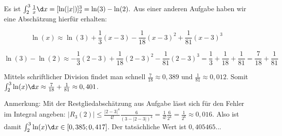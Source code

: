 \item Es ist $\int_2^3 \frac{1}{x} \d x = \lbrack \ln(|x|) \rbrack_2^3 = \ln(3) - \ln(2).$ Aus einer anderen Aufgabe haben wir eine Abschätzung hierfür erhalten:

$$\ln(x) \approx \ln(3) + \frac{1}{3} (x-3) - \frac{1}{18} (x-3)^2 + \frac{1}{81} (x-3)^3$$

$$\ln(3)-\ln(2) \approx -\frac{1}{3} (2-3) + \frac{1}{18} (2-3)^2 - \frac{1}{81} (2-3)^3 = \frac{1}{3}+\frac{1}{18}+\frac{1}{81} = \frac{7}{18} + \frac{1}{81}$$

Mittels schriftlicher Division findet man schnell $\frac{7}{18} \approx 0,389$ und $\frac{1}{81} \approx 0,012$. Somit $\int_2^3 \ln(x) \d x \approx \frac{7}{18}+\frac{1}{81} \approx 0,401$.

Anmerkung: Mit der Restgliedabschätzung aus Aufgabe lässt sich für den Fehler im Integral angeben: $|R_3(2)| \leq \frac{|2-3|^4}{4!} \frac{6}{(3-|2-3|)^4} = \frac{1}{4!} \frac{6}{2^4} = \frac{1}{2^6} \approx 0,016$. Also ist damit $\int_2^3 \ln(x) \d x \in [0,385;0,417]$. Der tatsächliche Wert ist $0,405465...$

